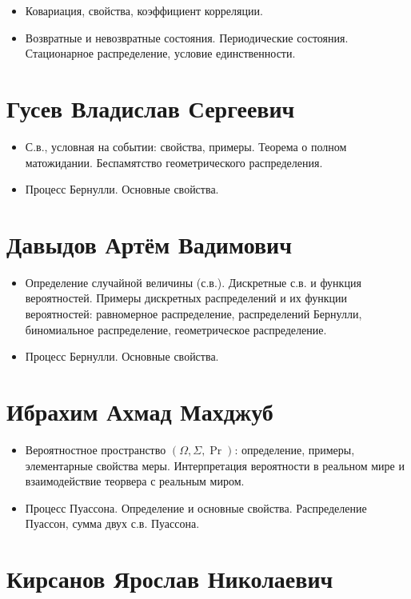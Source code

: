 \documentclass[12pt]{article}
\begin{document}
\begin{itemize}
  \item Ковариация, свойства, коэффициент корреляции.
  \item Возвратные и невозвратные состояния. Периодические состояния. Стационарное распределение, условие единственности. 
\end{itemize}

\section{Гусев Владислав Сергеевич}

\begin{itemize}
  \item С.в., условная на событии: свойства, примеры. Теорема о полном матожидании. Беспамятство геометрического распределения.
  \item Процесс Бернулли. Основные свойства.
\end{itemize}

\section{Давыдов Артём Вадимович}

\begin{itemize}
  \item Определение случайной величины (с.в.). Дискретные с.в. и функция вероятностей. Примеры дискретных распределений и их функции вероятностей: равномерное распределение, распределений Бернулли, биномиальное распределение, геометрическое распределение.
  \item Процесс Бернулли. Основные свойства.
\end{itemize}

\section{Ибрахим Ахмад Махджуб}

\begin{itemize}
  \item Вероятностное пространство $(\Omega, \Sigma, \Pr)$: определение, примеры, элементарные свойства меры. Интерпретация вероятности в реальном мире и взаимодействие теорвера с реальным миром.
  \item Процесс Пуассона. Определение и основные свойства. Распределение Пуассон, сумма двух с.в. Пуассона.
\end{itemize}

\section{Кирсанов Ярослав Николаевич}
\end{document}
